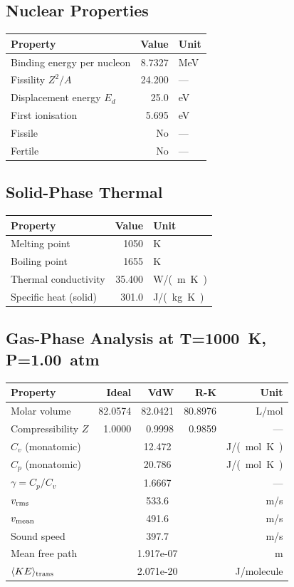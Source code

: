 \documentclass[11pt,a4paper]{article}
\begin{document}
\subsection{Nuclear Properties}
\begin{tabular}{lrl}
  \toprule
  Property & Value & Unit \\
  \midrule
  Binding energy per nucleon & 8.7327 & \si{MeV} \\
  Fissility $Z^2/A$ & 24.200 & --- \\
  Displacement energy $E_d$ & 25.0 & \si{eV} \\
  First ionisation & 5.695 & \si{eV} \\
  Fissile & No & --- \\
  Fertile & No & --- \\
  \bottomrule
\end{tabular}

\subsection{Solid-Phase Thermal}
\begin{tabular}{lrl}
  \toprule
  Property & Value & Unit \\
  \midrule
  Melting point & 1050 & \si{K} \\
  Boiling point & 1655 & \si{K} \\
  Thermal conductivity & 35.400 & \si{W/(m.K)} \\
  Specific heat (solid) & 301.0 & \si{J/(kg.K)} \\
  \bottomrule
\end{tabular}

\subsection{Gas-Phase Analysis at T=\SI{1000}{K}, P=\SI{1.00}{atm}}
\begin{tabular}{lrrrr}
  \toprule
  Property & Ideal & VdW & R-K & Unit \\
  \midrule
  Molar volume & 82.0574 & 82.0421 & 80.8976 & \si{L/mol} \\
  Compressibility $Z$ & 1.0000 & 0.9998 & 0.9859 & --- \\
  \midrule
  $C_v$ (monatomic) & \multicolumn{3}{c}{12.472} & \si{J/(mol.K)} \\
  $C_p$ (monatomic) & \multicolumn{3}{c}{20.786} & \si{J/(mol.K)} \\
  $\gamma = C_p/C_v$ & \multicolumn{3}{c}{1.6667} & --- \\
  $v_{\rm rms}$ & \multicolumn{3}{c}{533.6} & \si{m/s} \\
  $v_{\rm mean}$ & \multicolumn{3}{c}{491.6} & \si{m/s} \\
  Sound speed & \multicolumn{3}{c}{397.7} & \si{m/s} \\
  Mean free path & \multicolumn{3}{c}{1.917e-07} & \si{m} \\
  $\langle KE \rangle_{\rm trans}$ & \multicolumn{3}{c}{2.071e-20} & \si{J/molecule} \\
  \bottomrule
\end{tabular}
\end{document}
